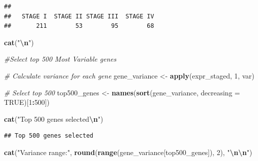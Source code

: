\documentclass[
]{article}
\newenvironment{Shaded}{\begin{snugshade}}{\end{snugshade}}
\newcommand{\AttributeTok}[1]{\textcolor[rgb]{0.13,0.29,0.53}{#1}}
\newcommand{\CommentTok}[1]{\textcolor[rgb]{0.56,0.35,0.01}{\textit{#1}}}
\newcommand{\ConstantTok}[1]{\textcolor[rgb]{0.56,0.35,0.01}{#1}}
\newcommand{\DecValTok}[1]{\textcolor[rgb]{0.00,0.00,0.81}{#1}}
\newcommand{\FunctionTok}[1]{\textcolor[rgb]{0.13,0.29,0.53}{\textbf{#1}}}
\newcommand{\NormalTok}[1]{#1}
\newcommand{\OtherTok}[1]{\textcolor[rgb]{0.56,0.35,0.01}{#1}}
\newcommand{\SpecialCharTok}[1]{\textcolor[rgb]{0.81,0.36,0.00}{\textbf{#1}}}
\newcommand{\StringTok}[1]{\textcolor[rgb]{0.31,0.60,0.02}{#1}}
\begin{document}
\begin{Shaded}
\end{Shaded}

\begin{verbatim}
## 
##   STAGE I  STAGE II STAGE III  STAGE IV 
##       211        53        95        68
\end{verbatim}

\begin{Shaded}
\begin{Highlighting}[]
\FunctionTok{cat}\NormalTok{(}\StringTok{"}\SpecialCharTok{\textbackslash{}n}\StringTok{"}\NormalTok{)}
\end{Highlighting}
\end{Shaded}

\begin{Shaded}
\begin{Highlighting}[]
\CommentTok{\#Select top 500 Most Variable genes}

\CommentTok{\# Calculate variance for each gene}
\NormalTok{gene\_variance }\OtherTok{\textless{}{-}} \FunctionTok{apply}\NormalTok{(expr\_staged, }\DecValTok{1}\NormalTok{, var)}

\CommentTok{\# Select top 500}
\NormalTok{top500\_genes }\OtherTok{\textless{}{-}} \FunctionTok{names}\NormalTok{(}\FunctionTok{sort}\NormalTok{(gene\_variance, }\AttributeTok{decreasing =} \ConstantTok{TRUE}\NormalTok{)[}\DecValTok{1}\SpecialCharTok{:}\DecValTok{500}\NormalTok{])}

\FunctionTok{cat}\NormalTok{(}\StringTok{"Top 500 genes selected}\SpecialCharTok{\textbackslash{}n}\StringTok{"}\NormalTok{)}
\end{Highlighting}
\end{Shaded}

\begin{verbatim}
## Top 500 genes selected
\end{verbatim}

\begin{Shaded}
\begin{Highlighting}[]
\FunctionTok{cat}\NormalTok{(}\StringTok{"Variance range:"}\NormalTok{, }\FunctionTok{round}\NormalTok{(}\FunctionTok{range}\NormalTok{(gene\_variance[top500\_genes]), }\DecValTok{2}\NormalTok{), }\StringTok{"}\SpecialCharTok{\textbackslash{}n\textbackslash{}n}\StringTok{"}\NormalTok{)}
\end{Highlighting}
\end{Shaded}
\end{document}
